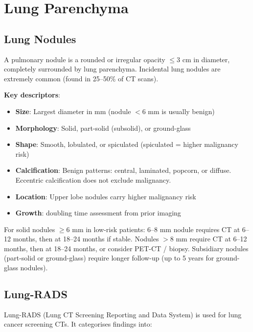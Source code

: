 \section{Lung Parenchyma}

\subsection{Lung Nodules}
A pulmonary nodule is a rounded or irregular opacity $\leq 3$ cm in diameter, completely surrounded by lung parenchyma. Incidental lung nodules are extremely common (found in 25--50\% of CT scans).

\textbf{Key descriptors}:
\begin{itemize}
  \item \textbf{Size}: Largest diameter in mm (nodule $< 6$ mm is usually benign)
  \item \textbf{Morphology}: Solid, part-solid (subsolid), or ground-glass
  \item \textbf{Shape}: Smooth, lobulated, or spiculated (spiculated = higher malignancy risk)
  \item \textbf{Calcification}: Benign patterns: central, laminated, popcorn, or diffuse. Eccentric calcification does not exclude malignancy.
  \item \textbf{Location}: Upper lobe nodules carry higher malignancy risk
  \item \textbf{Growth}: doubling time assessment from prior imaging
\end{itemize}

\begin{pearlbox}
For solid nodules $\geq 6$ mm in low-risk patients: 6--8 mm nodule requires CT at 6--12 months, then at 18--24 months if stable. Nodules $> 8$ mm require CT at 6--12 months, then at 18--24 months, or consider PET-CT / biopsy. Subsidiary nodules (part-solid or ground-glass) require longer follow-up (up to 5 years for ground-glass nodules).
\end{pearlbox}

\subsection{Lung-RADS}
Lung-RADS (Lung CT Screening Reporting and Data System) is used for lung cancer screening CTs. It categorises findings into:

